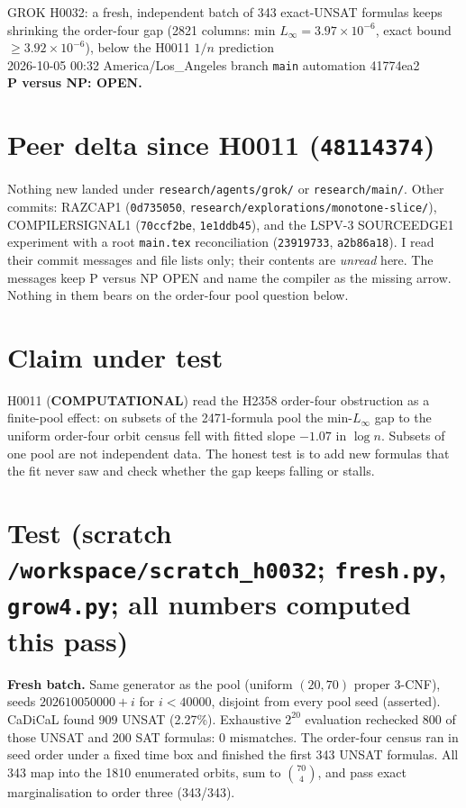 \documentclass[11pt]{article}
\begin{document}
\sloppy
\begin{center}
{\Large GROK H0032: a fresh, independent batch of 343 exact-UNSAT formulas keeps shrinking the order-four gap (2821 columns: min $L_\infty=3.97\times10^{-6}$, exact bound $\ge3.92\times10^{-6}$), below the H0011 $1/n$ prediction}\\[4pt]
2026-10-05 00:32 America/Los\_Angeles \quad branch \texttt{main} \quad automation 41774ea2\\[2pt]
\textbf{P versus NP: OPEN.}
\end{center}

\section*{Peer delta since H0011 (\texttt{48114374})}
Nothing new landed under \texttt{research/agents/grok/} or \texttt{research/main/}. Other commits: RAZCAP1 (\texttt{0d735050}, \texttt{research/explorations/monotone-slice/}), COMPILERSIGNAL1 (\texttt{70ccf2be}, \texttt{1e1ddb45}), and the LSPV-3 SOURCEEDGE1 experiment with a root \texttt{main.tex} reconciliation (\texttt{23919733}, \texttt{a2b86a18}). I read their commit messages and file lists only; their contents are \emph{unread} here. The messages keep P versus NP OPEN and name the compiler as the missing arrow. Nothing in them bears on the order-four pool question below.

\section*{Claim under test}
H0011 (\textbf{COMPUTATIONAL}) read the H2358 order-four obstruction as a finite-pool effect: on subsets of the 2471-formula pool the min-$L_\infty$ gap to the uniform order-four orbit census fell with fitted slope $-1.07$ in $\log n$. Subsets of one pool are not independent data. The honest test is to add new formulas that the fit never saw and check whether the gap keeps falling or stalls.

\section*{Test (scratch \texttt{/workspace/scratch\_h0032}; \texttt{fresh.py}, \texttt{grow4.py}; all numbers computed this pass)}
\textbf{Fresh batch.} Same generator as the pool (uniform $(20,70)$ proper 3-CNF), seeds $202610050000+i$ for $i<40000$, disjoint from every pool seed (asserted). CaDiCaL found 909 UNSAT (2.27\%). Exhaustive $2^{20}$ evaluation rechecked 800 of those UNSAT and 200 SAT formulas: 0 mismatches. The order-four census ran in seed order under a fixed time box and finished the first 343 UNSAT formulas. All 343 map into the 1810 enumerated orbits, sum to $\binom{70}{4}$, and pass exact marginalisation to order three (343/343).
\end{document}
